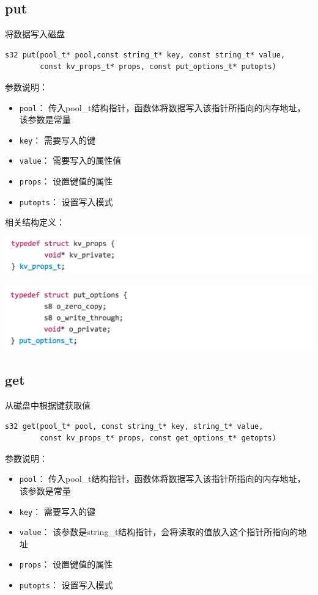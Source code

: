 		\subsection{put}
			将数据写入磁盘
		\begin{Verbatim}[frame = none]
    s32 put(pool_t* pool,const string_t* key, const string_t* value,
	    const kv_props_t* props, const put_options_t* putopts)
		\end{Verbatim}

		参数说明：
		\begin{itemize}
		\item \verb|pool|：
			传入pool\_t结构指针，函数体将数据写入该指针所指向的内存地址，该参数是常量
		\item \verb|key|：
			需要写入的键
		\item \verb|value|：
			需要写入的属性值
		\item \verb|props|：
			设置键值的属性
		\item \verb|putopts|：
			设置写入模式
		\end{itemize}

		相关结构定义：
		\begin{center}
			\includegraphics[width=13.9cm]{img/figure8.pdf}
		\end{center}
		\begin{center}
			\includegraphics[width=13.9cm]{img/figure9.pdf}
		\end{center}


		\subsection{get}
			从磁盘中根据键获取值
		\begin{Verbatim}[frame = none]
    s32 get(pool_t* pool, const string_t* key, string_t* value, 
	    const kv_props_t* props, const get_options_t* getopts)
		\end{Verbatim}

		参数说明：
		\begin{itemize}
		\item \verb|pool|：
			传入pool\_t结构指针，函数体将数据写入该指针所指向的内存地址，该参数是常量
		\item \verb|key|：
			需要写入的键
		\item \verb|value|：
			该参数是string\_t结构指针，会将读取的值放入这个指针所指向的地址
		\item \verb|props|：
			设置键值的属性
		\item \verb|putopts|：
			设置写入模式
		\end{itemize}


